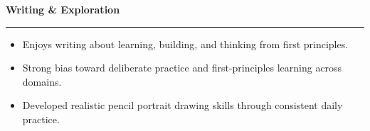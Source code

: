 \documentclass[10pt,a4paper]{article}
\newcommand{\cvsection}[1]{%
  \par\vspace{14pt}%
  {\large\bfseries #1\par}%
  \vspace{-7.2pt}%
  \noindent\rule{\linewidth}{0.4pt}\par
  \vspace{-1pt}%
}
\begin{document}
\cvsection{Writing \& Exploration}
\begin{itemize}
  \item Enjoys writing about learning, building, and thinking from first principles.
  \item Strong bias toward deliberate practice and first-principles learning across domains.
  \item Developed realistic pencil portrait drawing skills through consistent daily practice.
\end{itemize}
\end{document}
